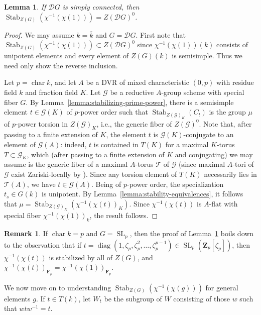 \documentclass[11pt,reqno]{amsart}
\newtheorem{lemma}[theorem]{Lemma}
\theoremstyle{definition}
\newtheorem{remark}[theorem]{Remark}
\newcommand{\bF}{{\mathbf F}}
\newcommand{\bZ}{{\mathbf Z}}
\newcommand{\cG}{\mathcal{G}}
\newcommand{\cT}{\mathcal{T}}
\newcommand{\sD}{{\mathscr D}}
\DeclareMathOperator{\chara}{char}
\DeclareMathOperator{\diag}{diag}
\DeclareMathOperator{\SL}{SL}
\DeclareMathOperator{\Stab}{Stab}
\newcommand{\ov}[1]{\overline{#1}}
\begin{document}
\begin{lemma}\label{lemma:Springer-iso-6.4}
    If $\sD G$ is simply connected, then $\Stab_{Z(G)}(\chi^{-1}(\chi(1))) = Z(\sD G)^0$.
\end{lemma}

\begin{proof}
    We may assume $k = \ov{k}$ and $G = \sD G$. First note that $\Stab_{Z(G)}(\chi^{-1}(\chi(1))) \subset Z(\sD G)^0$ since $\chi^{-1}(\chi(1))(k)$ consists of unipotent elements and every element of $Z(G)(k)$ is semisimple. Thus we need only show the reverse inclusion.
    
    Let $p = \chara k$, and let $A$ be a DVR of mixed characteristic $(0, p)$ with residue field $k$ and fraction field $K$. Let $\cG$ be a reductive $A$-group scheme with special fiber $G$. By Lemma~\ref{lemma:stabilizing-prime-power}, there is a semisimple element $t \in \cG(K)$ of $p$-power order such that $\Stab_{Z(\cG)_K}(C_t)$ is the group $\mu$ of $p$-power torsion in $Z(\cG)_K$, i.e., the generic fiber of $Z(\cG)^0$. Note that, after passing to a finite extension of $K$, the element $t$ is $\cG(K)$-conjugate to an element of $\cG(A)$: indeed, $t$ is contained in $T(K)$ for a maximal $K$-torus $T \subset \cG_K$, which (after passing to a finite extension of $K$ and conjugating) we may assume is the generic fiber of a maximal $A$-torus $\cT$ of $\cG$ (since maximal $A$-tori of $\cG$ exist Zariski-locally by \cite[Expos\'e XIV, Corollaire 3.20]{SGA3II}). Since any torsion element of $T(K)$ necessarily lies in $\cT(A)$, we have $t \in \cG(A)$. Being of $p$-power order, the specialization $t_s \in G(k)$ is unipotent. By Lemma~\ref{lemma:stability-equivalences}, it follows that $\mu = \Stab_{Z(\cG)_K}(\chi^{-1}(\chi(t))_K)$. Since $\chi^{-1}(\chi(t))$ is $A$-flat with special fiber $\chi^{-1}(\chi(1))_k$, the result follows.
\end{proof}

\begin{remark}
    If $\chara k = p$ and $G = \SL_p$, then the proof of Lemma~\ref{lemma:Springer-iso-6.4} boils down to the observation that if $t = \diag(1, \zeta_p, \zeta_p^2, \dots, \zeta_p^{p - 1}) \in \SL_p(\bZ_p[\zeta_p])$, then $\chi^{-1}(\chi(t))$ is stabilized by all of $Z(G)$, and $\chi^{-1}(\chi(t))_{\bF_p} = \chi^{-1}(\chi(1))_{\bF_p}$.
\end{remark}

We now move on to understanding $\Stab_{Z(G)}(\chi^{-1}(\chi(g)))$ for general elements $g$. If $t \in T(k)$, let $W_t$ be the subgroup of $W$ consisting of those $w$ such that $wtw^{-1} = t$.
\end{document}
